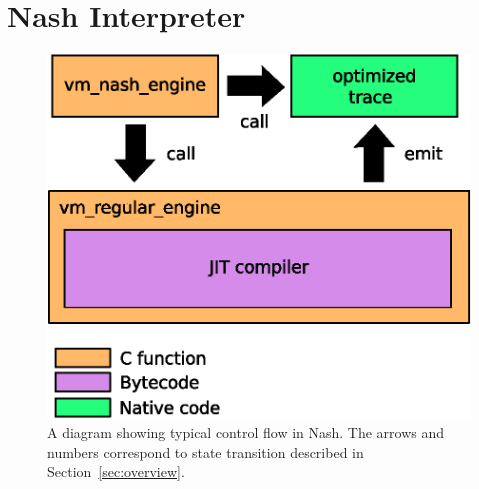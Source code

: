 \documentclass[preprint, 10pt]{sigplanconf}
\begin{document}





\section{Nash Interpreter}
\label{sec:interpreter}

\begin{figure}
  \centering
  \includegraphics[width=0.4 \textwidth]{overview}
  \caption{A diagram showing typical control flow in Nash. The arrows and
    numbers correspond to state transition described in
    Section~\ref{sec:overview}.}
\label{fig:overview}
\end{figure}
\end{document}
